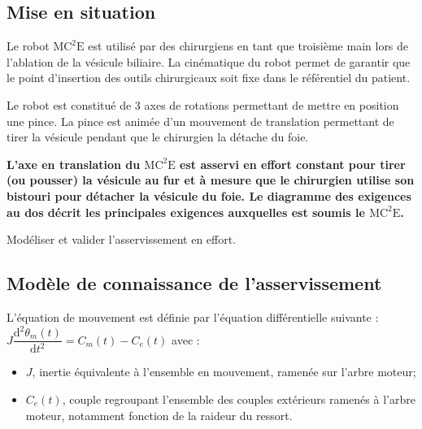 \documentclass[10pt,fleqn]{article} %
\begin{document}

\vspace{5cm}
\pagestyle{fancy}
\thispagestyle{plain}


\def\columnseprulecolor{\color{ocre}}
\setlength{\columnseprule}{0.4pt} 

\ifprof
\else
\begin{multicols}{2}
\fi
\section*{Mise en situation}
\ifprof
\else
Le robot $\text{MC}^2\text{E}$ est utilisé par des chirurgiens en tant que troisième main lors de l'ablation de la vésicule biliaire. La cinématique du robot permet de garantir que le point d'insertion des outils chirurgicaux soit fixe dans le référentiel du patient. 

Le robot est constitué de 3 axes de rotations permettant de mettre en position une pince. La pince est animée d'un mouvement de translation permettant de tirer la vésicule pendant que le chirurgien la détache du foie. 

\textbf{L’axe en translation du $\text{MC}^2\text{E}$ est asservi en effort constant pour tirer (ou pousser) la vésicule au fur et à mesure que le chirurgien utilise son bistouri pour détacher la vésicule du foie. Le diagramme des exigences au dos décrit les principales exigences auxquelles est soumis le $\text{MC}^2\text{E}$.}


\begin{obj}
Modéliser et valider l’asservissement en effort.
\end{obj}

\fi


\subsection*{Modèle de connaissance de l'asservissement}
\ifprof
\else
L’équation de mouvement est définie par l’équation différentielle suivante : 
$J\dfrac{\text{d}^2\theta_m(t)}{\text{d}t^2}=C_m(t)-C_e(t)$  avec :
\begin{itemize}
\item $J$, inertie équivalente à l’ensemble en mouvement, ramenée sur l’arbre moteur;
\item $C_e(t)$, couple regroupant l’ensemble des couples extérieurs ramenés à l’arbre moteur, notamment fonction de la raideur du ressort.
\end{itemize}



\end{multicols}
\end{document}
